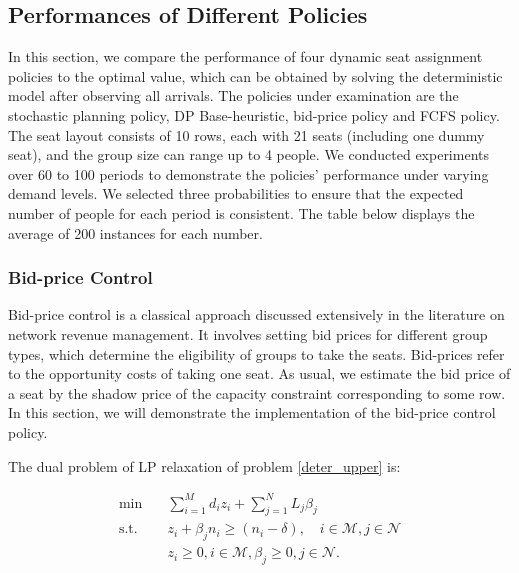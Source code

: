 
\subsection{Performances of Different Policies}
In this section, we compare the performance of four dynamic seat assignment policies to the optimal value, which can be obtained by solving the deterministic model after observing all arrivals. The policies under examination are the stochastic planning policy, DP Base-heuristic, bid-price policy and FCFS policy. The seat layout consists of 10 rows, each with 21 seats (including one dummy seat), and the group size can range up to 4 people. We conducted experiments over 60 to 100 periods to demonstrate the policies' performance under varying demand levels. We selected three probabilities to ensure that the expected number of people for each period is consistent. The table below displays the average of 200 instances for each number.


\subsubsection{Bid-price Control}
Bid-price control is a classical approach discussed extensively in the literature on network revenue management. It involves setting bid prices for different group types, which determine the eligibility of groups to take the seats. Bid-prices refer to the opportunity costs of taking one seat. As usual, we estimate the bid price of a seat by the shadow price of the capacity constraint corresponding to some row. In this section, we will demonstrate the implementation of the bid-price control policy. 

The dual problem of LP relaxation of problem \eqref{deter_upper} is:

\begin{equation}\label{bid-price_dual}
  \begin{aligned}
  \min \quad & \sum_{i=1}^{M} d_i z_i + \sum_{j= 1}^{N} L_j \beta_{j} \\
  \text {s.t.} \quad & z_{i} + \beta_j n_i \geq (n_i-\delta), \quad i \in \mathcal{M}, j \in \mathcal{N} \\
  & z_{i} \geq 0, i \in \mathcal{M}, \beta_{j} \geq 0, j \in \mathcal{N}.
  \end{aligned}
\end{equation}

